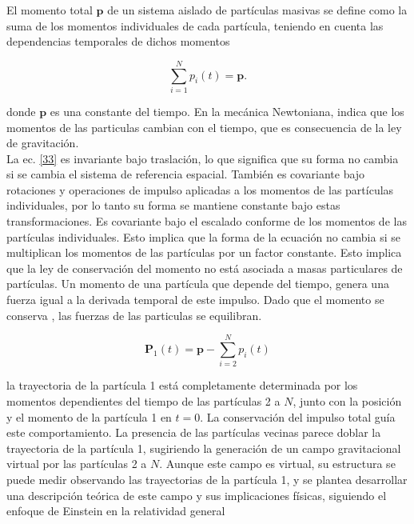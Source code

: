 \documentclass[a4paper,11pt]{article}
\begin{document}
El momento total \(\textbf{p}\) de un sistema aislado de partículas masivas se define como la suma de los momentos individuales de cada partícula, teniendo en cuenta las dependencias temporales de dichos momentos \cite{Smilga} 

\begin{equation}
    \sum_{i=1}^{N} p_i(t)=\textbf{p}.
    \label{33}
\end{equation}

donde \(\textbf{p}\) es una constante del tiempo. En la mecánica Newtoniana, indica que los momentos de las particulas cambian con el tiempo, que es consecuencia de la ley de gravitación.
\\

La ec. \ref{33} es invariante bajo traslación, lo que significa que su forma no cambia si se cambia el sistema de referencia espacial. También es covariante bajo rotaciones y operaciones de impulso aplicadas a los momentos de las partículas individuales, por lo tanto su forma se mantiene constante bajo estas transformaciones. 
Es covariante bajo el escalado conforme de los momentos de las partículas individuales. Esto implica que la forma de la ecuación no cambia si se multiplican los momentos de las partículas por un factor constante. Esto implica que la ley de conservación del momento no está asociada a masas particulares de partículas.
Un momento de una partícula  que depende del tiempo, genera una fuerza igual a la derivada temporal de este impulso. Dado que el momento se conserva , las fuerzas de las particulas se equilibran. 

\begin{equation}
    \textbf{P}_1 (t)=\textbf{p} -\sum_{i=2}^{N} p_i(t)
\end{equation}

la trayectoria de la partícula 1 está completamente determinada por los momentos dependientes del tiempo de las partículas 2 a \(N\), junto con la posición y el momento de la partícula 1 en \(t=0\). La conservación del impulso total guía este comportamiento. La presencia de las partículas vecinas parece doblar la trayectoria de la partícula 1, sugiriendo la generación de un campo gravitacional virtual por las partículas 2 a \(N\). Aunque este campo es virtual, su estructura se puede medir observando las trayectorias de la partícula 1, y se plantea desarrollar una descripción teórica de este campo y sus implicaciones físicas, siguiendo el enfoque de Einstein en la relatividad general
\end{document}
